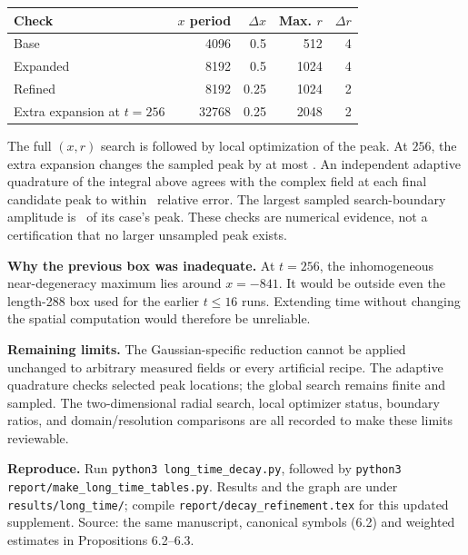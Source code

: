 \begin{center}\begin{tabular}{lrrrr}\toprule
Check & $x$ period & $\Delta x$ & Max. $r$ & $\Delta r$\\\midrule
Base & 4096 & 0.5 & 512 & 4\\
Expanded & 8192 & 0.5 & 1024 & 4\\
Refined & 8192 & 0.25 & 1024 & 2\\
Extra expansion at $t=256$ & 32768 & 0.25 & 2048 & 2\\\bottomrule
\end{tabular}\end{center}
The full $(x,r)$ search is followed by local optimization of the peak. At $256$,
the extra expansion changes the sampled peak by at most \LongDomain. An independent
adaptive quadrature of the integral above agrees with the complex field at each
final candidate peak to within \LongQuad\ relative error. The largest sampled
search-boundary amplitude is \LongEdge\ of its case's peak. These checks are
numerical evidence, not a certification that no larger unsampled peak exists.

\textbf{Why the previous box was inadequate.} At $t=256$, the inhomogeneous
near-degeneracy maximum lies around $x=-841$. It would be outside even the
length-288 box used for the earlier $t\le16$ runs. Extending time without changing
the spatial computation would therefore be unreliable.

\textbf{Remaining limits.} The Gaussian-specific reduction cannot be applied
unchanged to arbitrary measured fields or every artificial recipe. The adaptive
quadrature checks selected peak locations; the global search remains finite and
sampled. The two-dimensional radial search, local optimizer status, boundary ratios,
and domain/resolution comparisons are all recorded to make these limits reviewable.

\textbf{Reproduce.} Run \texttt{python3 long\_time\_decay.py}, followed by
\texttt{python3 report/make\_long\_time\_tables.py}. Results and the graph are under
\texttt{results/long\_time/}; compile \texttt{report/decay\_refinement.tex} for this
updated supplement. Source: the same manuscript, canonical symbols (6.2) and
weighted estimates in Propositions 6.2--6.3.
